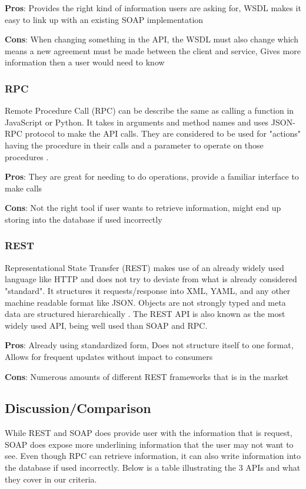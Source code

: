 \documentclass[10pt, onecolumn, draftclsnofoot, letterpaper, compsoc]{IEEEtran}
\begin{document}
    \textbf{Pros}: Provides the right kind of information users are asking for, WSDL makes it easy to link up with an existing SOAP implementation
    
    \textbf{Cons}: When changing something in the API, the WSDL must also change which means a new agreement must be made between the client and service, Gives more information then a user would need to know
    
    \subsubsection{RPC}
    Remote Procedure Call (RPC) can be describe the same as calling a function in JavaScript or Python.
    It takes in arguments and method names and uses JSON-RPC protocol to make the API calls.
    They are considered to be used for "actions" having the procedure in their calls and a parameter to operate on those procedures \cite{rpc}.
    
    \textbf{Pros}: They are great for needing to do operations, provide a familiar interface to make calls
    
    \textbf{Cons}: Not the right tool if user wants to retrieve information, might end up storing into the database if used incorrectly
    
    \subsubsection{REST}
    Representational State Transfer (REST) makes use of an already widely used language like HTTP and does not try to deviate from what is already considered "standard".
    It structures it requests/response into XML, YAML, and any other machine readable format like JSON.
    Objects are not strongly typed and meta data are structured hierarchically \cite{SOAPvsREST}.
    The REST API is also known as the most widely used API, being well used than SOAP and RPC.
    
    \textbf{Pros}: Already using standardized form, Does not structure itself to one format, Allows for frequent updates without impact to consumers
    
    \textbf{Cons}: Numerous amounts of different REST frameworks that is in the market
    
\subsection{Discussion/Comparison}
While REST and SOAP does provide user with the information that is request, SOAP does expose more underlining information that the user may not want to see.
Even though RPC can retrieve information, it can also write information into the database if used incorrectly.
Below is a table illustrating the 3 APIs and what they cover in our criteria.
\end{document}
